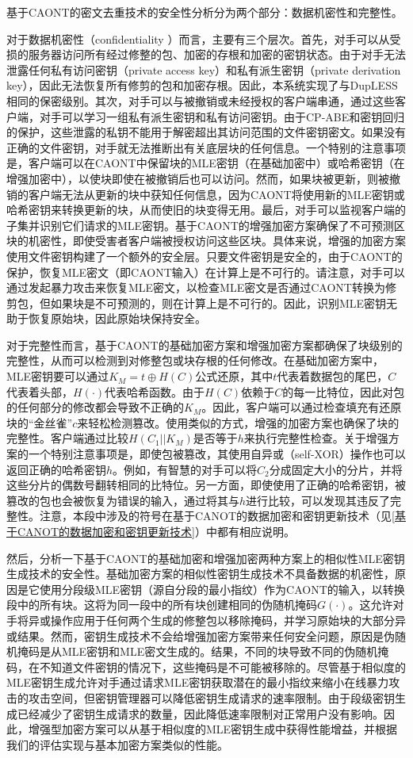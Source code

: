 \documentclass[promaster]{thesis-uestc}
\begin{document}
基于CAONT的密文去重技术的安全性分析分为两个部分：数据机密性和完整性。

对于数据机密性（confidentiality ）而言，主要有三个层次。首先，对手可以从受损的服务器访问所有经过修整的包、加密的存根和加密的密钥状态。由于对手无法泄露任何私有访问密钥（private access key）和私有派生密钥（private derivation key），因此无法恢复所有修剪的包和加密存根。因此，本系统实现了与DupLESS相同的保密级别。其次，对手可以与被撤销或未经授权的客户端串通，通过这些客户端，对手可以学习一组私有派生密钥和私有访问密钥。由于CP-ABE和密钥回归的保护，这些泄露的私钥不能用于解密超出其访问范围的文件密钥密文。如果没有正确的文件密钥，对手就无法推断出有关底层块的任何信息。一个特别的注意事项是，客户端可以在CAONT中保留块的MLE密钥（在基础加密中）或哈希密钥（在增强加密中），以使块即使在被撤销后也可以访问。然而，如果块被更新，则被撤销的客户端无法从更新的块中获知任何信息，因为CAONT将使用新的MLE密钥或哈希密钥来转换更新的块，从而使旧的块变得无用。最后，对手可以监视客户端的子集并识别它们请求的MLE密钥。基于CAONT的增强加密方案确保了不可预测区块的机密性，即使受害者客户端被授权访问这些区块。具体来说，增强的加密方案使用文件密钥构建了一个额外的安全层。只要文件密钥是安全的，由于CAONT的保护，恢复MLE密文（即CAONT输入）在计算上是不可行的。请注意，对手可以通过发起暴力攻击来恢复MLE密文，以检查MLE密文是否通过CAONT转换为修剪包，但如果块是不可预测的，则在计算上是不可行的。因此，识别MLE密钥无助于恢复原始块，因此原始块保持安全。

对于完整性而言，基于CAONT的基础加密方案和增强加密方案都确保了块级别的完整性，从而可以检测到对修整包或块存根的任何修改。在基础加密方案中，MLE密钥要可以通过$K_M = t \oplus H(C)$公式还原，其中$t$代表着数据包的尾巴，$C$代表着头部，$H(\cdot)$代表哈希函数。由于$H(C)$依赖于$C$的每一比特位，因此对包的任何部分的修改都会导致不正确的$K_M$。因此，客户端可以通过检查填充有还原块的“金丝雀”$c$来轻松检测篡改。使用类似的方式，增强的加密方案也确保了块的完整性。客户端通过比较$H(C_1||K_M)$是否等于$h$来执行完整性检查。关于增强方案的一个特别注意事项是，即使包被篡改，其使用自异或（self-XOR）操作也可以返回正确的哈希密钥$h$。例如，有智慧的对手可以将$C_2$分成固定大小的分片，并将这些分片的偶数号翻转相同的比特位。另一方面，即使使用了正确的哈希密钥，被篡改的包也会被恢复为错误的输入，通过将其与$h$进行比较，可以发现其违反了完整性。注意，本段中涉及的符号在基于CANOT的数据加密和密钥更新技术（见\ref{基于CANOT的数据加密和密钥更新技术}）中都有相应说明。

然后，分析一下基于CAONT的基础加密和增强加密两种方案上的相似性MLE密钥生成技术的安全性。基础加密方案的相似性密钥生成技术不具备数据的机密性，原因是它使用分段级MLE密钥（源自分段的最小指纹）作为CAONT的输入，以转换段中的所有块。这将为同一段中的所有块创建相同的伪随机掩码$G(\cdot)$。这允许对手将异或操作应用于任何两个生成的修整包以移除掩码，并学习原始块的大部分异或结果。然而，密钥生成技术不会给增强加密方案带来任何安全问题，原因是伪随机掩码是从MLE密钥和MLE密文生成的。结果，不同的块导致不同的伪随机掩码，在不知道文件密钥的情况下，这些掩码是不可能被移除的。尽管基于相似度的MLE密钥生成允许对手通过请求MLE密钥获取潜在的最小指纹来缩小在线暴力攻击的攻击空间，但密钥管理器可以降低密钥生成请求的速率限制。由于段级密钥生成已经减少了密钥生成请求的数量，因此降低速率限制对正常用户没有影响。因此，增强型加密方案可以从基于相似度的MLE密钥生成中获得性能增益，并根据我们的评估实现与基本加密方案类似的性能。
\end{document}
